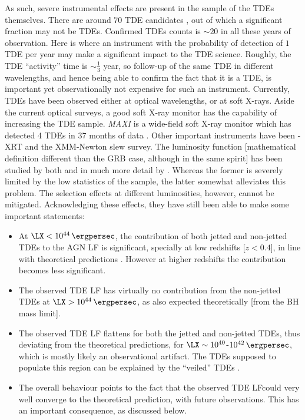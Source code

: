 As such, severe instrumental effects are present in the sample of the TDEs themselves. There are around $70$ TDE candidates \citep{Auchettl_et_al.-2017-ApJ}, out of which a significant fraction may not be TDEs. Confirmed TDEs counts is $\sim 20$ in all these years of observation. Here is where an instrument with the probability of detection of $1$ TDE per year may make a significant impact to the TDE science. Roughly, the TDE ``activity'' time is $\sim \frac{1}{3}$ year, so follow-up of the same TDE in different wavelengths, and hence being able to confirm the fact that it is a TDE, is important yet observationally not expensive for such an instrument. Currently, TDEs have been observed either at optical wavelengths, or at soft X-rays. Aside the current optical surveys, a good soft X-ray monitor has the capability of increasing the TDE sample. \emph{MAXI} is a wide-field soft X-ray monitor which has detected 4 TDEs in 37 months of data \citep{Kawamuro_et_al.-2016-PASJ}. Other important instruments have been \s -XRT and the XMM-Newton slew survey. The luminosity function [mathematical definition different than the GRB case, although in the same spirit] has been studied by both \cite{Kawamuro_et_al.-2016-PASJ} and in much more detail by \cite{Auchettl_et_al.-2018-ApJ}. Whereas the former is severely limited by the low statistics of the sample, the latter somewhat alleviates this problem. The selection effects at different luminosities, however, cannot be mitigated. Acknowledging these effects, they have still been able to make some important statements:

\begin{itemize}
\item At $\LX < 10^{44} \, \ergpersec$, the contribution of both jetted and non-jetted TDEs to the AGN LF is significant, specially at low redshifts [$z < 0.4$], in line with theoretical predictions \citep{Milosavljevic_et_al.-2006-ApJ}. However at higher redshifts the contribution becomes less significant.

\item The observed TDE LF has virtually no contribution from the non-jetted TDEs at $\LX > 10^{44} \, \ergpersec$, as also expected theoretically [from the BH mass limit].

\item The observed TDE LF flattens for both the jetted and non-jetted TDEs, thus deviating from the theoretical predictions, for $\LX \sim 10^{40}$-$10^{42} \, \ergpersec$, which is mostly likely an observational artifact. The TDEs supposed to populate this region can be explained by the ``veiled'' TDEs \citep{Auchettl_et_al.-2017-ApJ}.

\item The overall behaviour points to the fact that the observed TDE LFcould very well converge to the theoretical prediction, with future observations. This has an important consequence, as discussed below.
\end{itemize}

